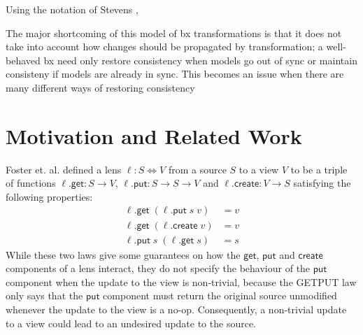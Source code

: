\documentclass[acmsmall,review,anonymous]{acmart}\settopmatter{printfolios=true,printccs=false,printacmref=false}
\theoremstyle{definition}
\newcommand{\kw}[1]{\ensuremath{\mathsf{#1}}\xspace}
\newcommand{\get}{\ensuremath{\kw{get}}\xspace}
\newcommand{\pput}{\ensuremath{\kw{put}}\xspace}
\newcommand{\create}{\ensuremath{\kw{create}}\xspace}
\begin{document}
Using the notation of Stevens \cite{stevens2010bidirectional},



The major shortcoming of this model of bx transformations is that it does not
take into account how changes should be propagated by transformation; a
well-behaved bx need only restore consistency when models go out of sync or
maintain consisteny if models are already in sync. This becomes an issue when
there are many different ways of restoring consistency

\section{Motivation and Related Work}
Foster et. al. \cite{foster2007combinators,foster2009bidirectional}
defined a lens $\ell : S \Leftrightarrow V$ from a source $S$ to a view $V$ to
be a triple of functions $\ell.\get : S \longrightarrow V$, $\ell.\pput : S
\longrightarrow S \longrightarrow V$ and $\ell.\create : V \longrightarrow S$
satisfying the following properties:
\begin{align*}
\ell.\get \; (\ell.\pput \; s \; v) &= v \tag{PUTGET}\\
\ell.\get \; (\ell.\create \; v) &= v \tag{CREATEGET}\\
\ell.\pput \; s \; (\ell.\get \; s) &= s \tag{GETPUT}
\end{align*}
While these two laws give some guarantees on how the \get, \pput and \create
components of a lens interact, they do not specify the behaviour of the \pput
component when the update to the view is non-trivial, because the GETPUT law
only says that the \pput component must return the original source unmodified
whenever the update to the view is a no-op. Consequently, a non-trivial update
to a view could lead to an undesired update to the source.
\end{document}
